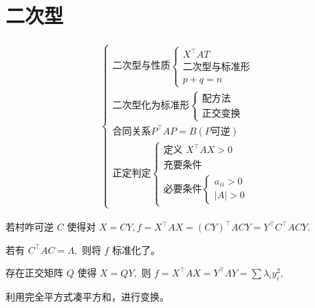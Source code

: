 \chapter{二次型}

\begin{equation*}
    \begin{aligned}
        \begin{cases}
            \textrm{二次型与性质}\begin{cases}
                X^\top AT\\ \textrm{二次型与标准形}\\ p+q = n
            \end{cases}\\ 
            \textrm{二次型化为标准形}\begin{cases}
                \textrm{配方法}\\\textrm{正交变换}
            \end{cases}\\ 
            \textrm{合同关系} P^\top AP = B (P\textrm{可逆})\\ 
            \textrm{正定判定}\begin{cases}
                \textrm{定义}\,\, X^\top AX > 0\\ 
                \textrm{充要条件}\\ 
                \textrm{必要条件} \begin{cases}
                    a_{ii} > 0\\ |A|>0
                \end{cases}
            \end{cases}
        \end{cases}
    \end{aligned}
\end{equation*}



若村咋可逆 $ C $ 使得对 $ X = CY, f = X^\top AX = (CY)^\top ACY = Y^\top C^\top ACY. $

若有 $ C^\top AC = \Lambda, $ 则将 $ f $ 标准化了。


存在正交矩阵 $ Q $ 使得 $ X = QY, $ 
则 $ f = X^\top AX = Y^\top \Lambda Y = \sum\lambda_i y^2_i, $ 


利用完全平方式凑平方和，进行变换。

